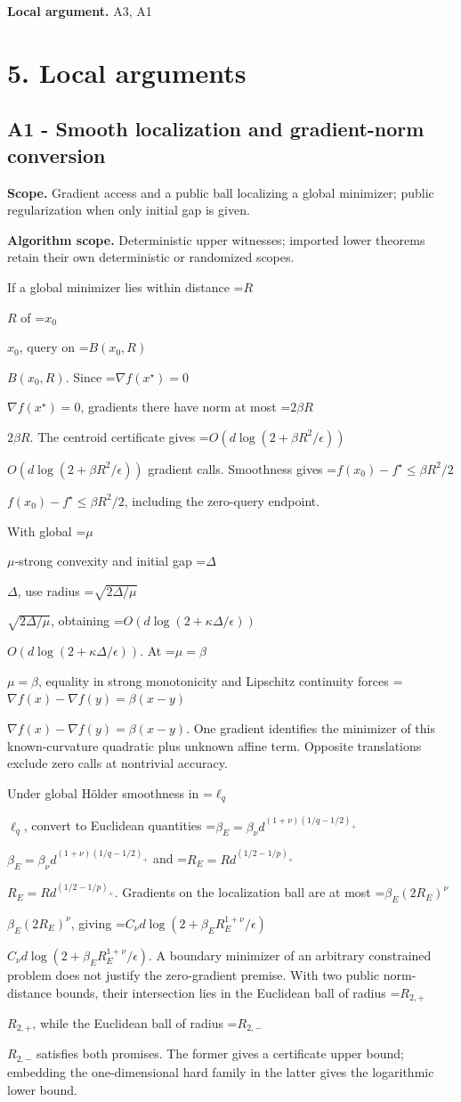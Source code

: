 \documentclass[10pt,a4paper]{article}
\newcommand{\AtlasMath}[1]{\par\begingroup\centering\setbox0=\hbox{$\displaystyle #1$}\ifdim\wd0>1.4\linewidth\typeout{ATLAS WIDE FORMULA: \the\wd0}\fi\ifdim\wd0>\linewidth\resizebox{\linewidth}{!}{\box0}\else\box0\fi\par\endgroup}
\newcommand{\AtlasInlineMath}[1]{\begingroup\setbox0=\hbox{$#1$}\ifdim\wd0>.4\linewidth\endgroup\AtlasMath{#1}\else\endgroup$#1$\fi}
\begin{document}
\textbf{Local argument.} A3, A1

\section{5. Local arguments}
\subsection{A1 - Smooth localization and gradient-norm conversion}
\textbf{Scope.} Gradient access and a public ball localizing a global minimizer; public regularization when only initial gap is given.

\textbf{Algorithm scope.} Deterministic upper witnesses; imported lower theorems retain their own deterministic or randomized scopes.

If a global minimizer lies within distance \AtlasInlineMath{R} of \AtlasInlineMath{x_0}, query on \AtlasInlineMath{B(x_0,R)}. Since \AtlasInlineMath{\nabla f(x^\star)=0}, gradients there have norm at most \AtlasInlineMath{2\beta R}. The centroid certificate gives \AtlasInlineMath{O(d\log(2+\beta R^2/\epsilon))} gradient calls. Smoothness gives \AtlasInlineMath{f(x_0)-f^\star\le\beta R^2/2}, including the zero-query endpoint.

With global \AtlasInlineMath{\mu}-strong convexity and initial gap \AtlasInlineMath{\Delta}, use radius \AtlasInlineMath{\sqrt{2\Delta/\mu}}, obtaining \AtlasInlineMath{O(d\log(2+\kappa\Delta/\epsilon))}. At \AtlasInlineMath{\mu=\beta}, equality in strong monotonicity and Lipschitz continuity forces \AtlasInlineMath{\nabla f(x)-\nabla f(y)=\beta(x-y)}. One gradient identifies the minimizer of this known-curvature quadratic plus unknown affine term. Opposite translations exclude zero calls at nontrivial accuracy.

Under global Hölder smoothness in \AtlasInlineMath{\ell_q}, convert to Euclidean quantities
\AtlasInlineMath{\beta_E=\beta_\nu d^{(1+\nu)(1/q-1/2)_+}} and
\AtlasInlineMath{R_E=Rd^{(1/2-1/p)_+}}. Gradients on the localization ball are at most \AtlasInlineMath{\beta_E(2R_E)^\nu}, giving
\AtlasInlineMath{C_\nu d\log(2+\beta_E R_E^{1+\nu}/\epsilon)}.
A boundary minimizer of an arbitrary constrained problem does not justify the zero-gradient premise. With two public norm-distance bounds, their intersection lies in the Euclidean ball of radius \AtlasInlineMath{R_{2,+}}, while the Euclidean ball of radius \AtlasInlineMath{R_{2,-}} satisfies both promises. The former gives a certificate upper bound; embedding the one-dimensional hard family in the latter gives the logarithmic lower bound.
\end{document}
